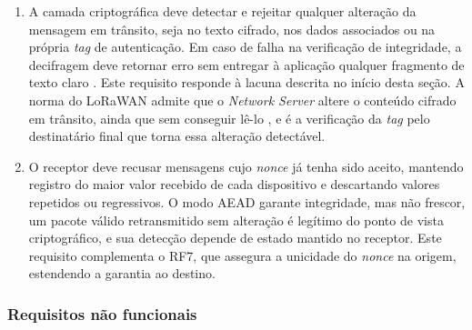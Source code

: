 \begin{enumerate}
    \item[RF8.] A camada criptográfica deve detectar e rejeitar qualquer alteração da mensagem em trânsito, seja no texto cifrado, nos dados associados ou na própria \textit{tag} de autenticação. Em caso de falha na verificação de integridade, a decifragem deve retornar erro sem entregar à aplicação qualquer fragmento de texto claro \cite{nist800232}. Este requisito responde à lacuna descrita no início desta seção. A norma do LoRaWAN admite que o \textit{Network Server} altere o conteúdo cifrado em trânsito, ainda que sem conseguir lê-lo \cite{lorawan104}, e é a verificação da \textit{tag} pelo destinatário final que torna essa alteração detectável.

    \item[RF9.] O receptor deve recusar mensagens cujo \textit{nonce} já tenha sido aceito, mantendo registro do maior valor recebido de cada dispositivo e descartando valores repetidos ou regressivos. O modo AEAD garante integridade, mas não frescor, um pacote válido retransmitido sem alteração é legítimo do ponto de vista criptográfico, e sua detecção depende de estado mantido no receptor. Este requisito complementa o RF7, que assegura a unicidade do \textit{nonce} na origem, estendendo a garantia ao destino.
\end{enumerate}

\subsubsection{Requisitos não funcionais}

